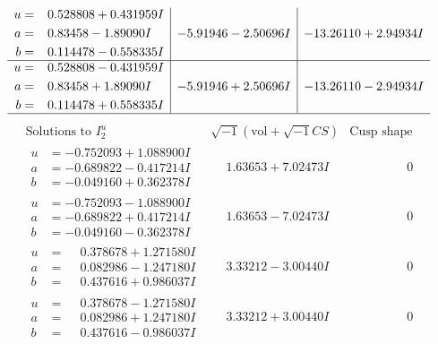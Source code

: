\documentclass[1p]{elsarticle_modified}
\theoremstyle{definition}
\newcommand{\I}{\sqrt{-1}}
\begin{document}
$$\begin{array}{c|c|c}
\begin{aligned}
u &= \phantom{-}0.528808 + 0.431959 I \\
a &= \phantom{-}0.83458 - 1.89090 I \\
b &= \phantom{-}0.114478 - 0.558335 I\end{aligned}
 & -5.91946 - 2.50696 I & -13.26110 + 2.94934 I \\ \hline\begin{aligned}
u &= \phantom{-}0.528808 - 0.431959 I \\
a &= \phantom{-}0.83458 + 1.89090 I \\
b &= \phantom{-}0.114478 + 0.558335 I\end{aligned}
 & -5.91946 + 2.50696 I & -13.26110 - 2.94934 I\\
 \hline 
 \end{array}$$\newpage$$\begin{array}{c|c|c}  
\text{Solutions to }I^u_{2}& \I (\text{vol} + \sqrt{-1}CS) & \text{Cusp shape}\\
 \hline 
\begin{aligned}
u &= -0.752093 + 1.088900 I \\
a &= -0.689822 - 0.417214 I \\
b &= -0.049160 + 0.362378 I\end{aligned}
 & \phantom{-}1.63653 + 7.02473 I & \phantom{-0.000000 } 0 \\ \hline\begin{aligned}
u &= -0.752093 - 1.088900 I \\
a &= -0.689822 + 0.417214 I \\
b &= -0.049160 - 0.362378 I\end{aligned}
 & \phantom{-}1.63653 - 7.02473 I & \phantom{-0.000000 } 0 \\ \hline\begin{aligned}
u &= \phantom{-}0.378678 + 1.271580 I \\
a &= \phantom{-}0.082986 - 1.247180 I \\
b &= \phantom{-}0.437616 + 0.986037 I\end{aligned}
 & \phantom{-}3.33212 - 3.00440 I & \phantom{-0.000000 } 0 \\ \hline\begin{aligned}
u &= \phantom{-}0.378678 - 1.271580 I \\
a &= \phantom{-}0.082986 + 1.247180 I \\
b &= \phantom{-}0.437616 - 0.986037 I\end{aligned}
 & \phantom{-}3.33212 + 3.00440 I & \phantom{-0.000000 } 0 \\ \hline\begin{aligned}

\end{aligned}
\end{array}$$
\end{document}
